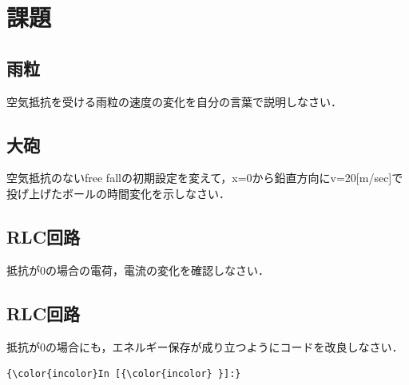 \documentclass[11pt,dvipdfmx]{jsarticle}
\begin{document}
    \section{課題}\label{ux8ab2ux984c}

\subsection{雨粒}\label{ux96e8ux7c92}

空気抵抗を受ける雨粒の速度の変化を自分の言葉で説明しなさい．

\subsection{大砲}\label{ux5927ux7832}

空気抵抗のないfree
fallの初期設定を変えて，x=0から鉛直方向にv=20{[}m/sec{]}で投げ上げたボールの時間変化を示しなさい．

\subsection{RLC回路}\label{rlcux56deux8def}

抵抗が0の場合の電荷，電流の変化を確認しなさい．

\subsection{RLC回路}\label{rlcux56deux8def-1}

抵抗が0の場合にも，エネルギー保存が成り立つようにコードを改良しなさい．

    \begin{Verbatim}[commandchars=\\\{\}]
{\color{incolor}In [{\color{incolor} }]:} 
\end{Verbatim}


    
    
    
    
\end{document}
